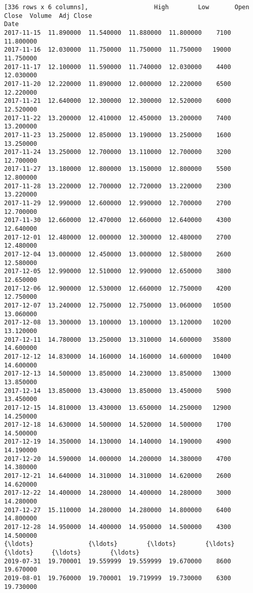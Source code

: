 \documentclass[11pt]{article}
\begin{document}
\begin{Verbatim}[commandchars=\\\{\}]
[336 rows x 6 columns],                  High        Low       Open      Close  Volume  Adj Close
Date                                                                     
2017-11-15  11.890000  11.540000  11.880000  11.800000    7100  11.800000
2017-11-16  12.030000  11.750000  11.750000  11.750000   19000  11.750000
2017-11-17  12.100000  11.590000  11.740000  12.030000    4400  12.030000
2017-11-20  12.220000  11.890000  12.000000  12.220000    6500  12.220000
2017-11-21  12.640000  12.300000  12.300000  12.520000    6000  12.520000
2017-11-22  13.200000  12.410000  12.450000  13.200000    7400  13.200000
2017-11-23  13.250000  12.850000  13.190000  13.250000    1600  13.250000
2017-11-24  13.250000  12.700000  13.110000  12.700000    3200  12.700000
2017-11-27  13.180000  12.800000  13.150000  12.800000    5500  12.800000
2017-11-28  13.220000  12.700000  12.720000  13.220000    2300  13.220000
2017-11-29  12.990000  12.600000  12.990000  12.700000    2700  12.700000
2017-11-30  12.660000  12.470000  12.660000  12.640000    4300  12.640000
2017-12-01  12.480000  12.000000  12.300000  12.480000    2700  12.480000
2017-12-04  13.000000  12.450000  13.000000  12.580000    2600  12.580000
2017-12-05  12.990000  12.510000  12.990000  12.650000    3800  12.650000
2017-12-06  12.900000  12.530000  12.660000  12.750000    4200  12.750000
2017-12-07  13.240000  12.750000  12.750000  13.060000   10500  13.060000
2017-12-08  13.300000  13.100000  13.100000  13.120000   10200  13.120000
2017-12-11  14.780000  13.250000  13.310000  14.600000   35800  14.600000
2017-12-12  14.830000  14.160000  14.160000  14.600000   10400  14.600000
2017-12-13  14.500000  13.850000  14.230000  13.850000   13000  13.850000
2017-12-14  13.850000  13.430000  13.850000  13.450000    5900  13.450000
2017-12-15  14.810000  13.430000  13.650000  14.250000   12900  14.250000
2017-12-18  14.630000  14.500000  14.520000  14.500000    1700  14.500000
2017-12-19  14.350000  14.130000  14.140000  14.190000    4900  14.190000
2017-12-20  14.590000  14.000000  14.200000  14.380000    4700  14.380000
2017-12-21  14.640000  14.310000  14.310000  14.620000    2600  14.620000
2017-12-22  14.400000  14.280000  14.400000  14.280000    3000  14.280000
2017-12-27  15.110000  14.280000  14.280000  14.800000    6400  14.800000
2017-12-28  14.950000  14.400000  14.950000  14.500000    4300  14.500000
{\ldots}               {\ldots}        {\ldots}        {\ldots}        {\ldots}     {\ldots}        {\ldots}
2019-07-31  19.700001  19.559999  19.559999  19.670000    8600  19.670000
2019-08-01  19.760000  19.700001  19.719999  19.730000    6300  19.730000

\end{Verbatim}
\end{document}
